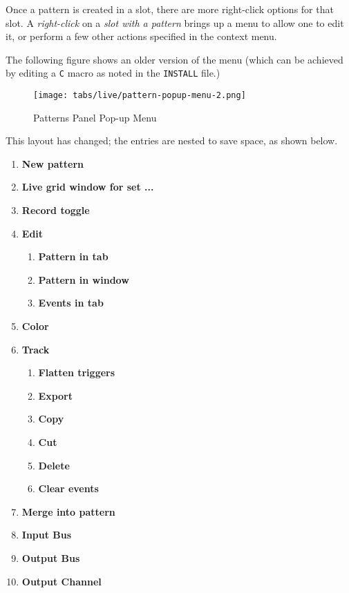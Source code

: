    Once a pattern is created in a slot, there are more
   right-click options for that slot.
   A \textsl{right-click} on a \textsl{slot with a pattern} brings up a menu
   to allow one to edit it, or perform a few other actions
   specified in the context menu.


   The following
   figure shows an older version of the menu (which can be achieved
   by editing a \texttt{C} macro as noted in the \texttt{INSTALL} file.)

\begin{figure}[H]
   \centering 
   \texttt{[image: tabs/live/pattern-popup-menu-2.png]}
   \caption{Patterns Panel Pop-up Menu}
   \label{fig:patterns_panel_popup_menu}
\end{figure}

   This layout has changed; the entries are nested to save space, as
   shown below.

   \begin{enumerate}
      \item \textbf{New pattern}
      \item \textbf{Live grid window for set ...}
      \item \textbf{Record toggle}
      \item \textbf{Edit}
      \begin{enumerate}
         \item \textbf{Pattern in tab}
         \item \textbf{Pattern in window}
         \item \textbf{Events in tab}
      \end{enumerate}
      \item \textbf{Color}
      \item \textbf{Track}
      \begin{enumerate}
         \item \textbf{Flatten triggers}
         \item \textbf{Export}
         \item \textbf{Copy}
         \item \textbf{Cut}
         \item \textbf{Delete}
         \item \textbf{Clear events}
      \end{enumerate}
      \item \textbf{Merge into pattern}
      \item \textbf{Input Bus}
      \item \textbf{Output Bus}
      \item \textbf{Output Channel}
   \end{enumerate}


